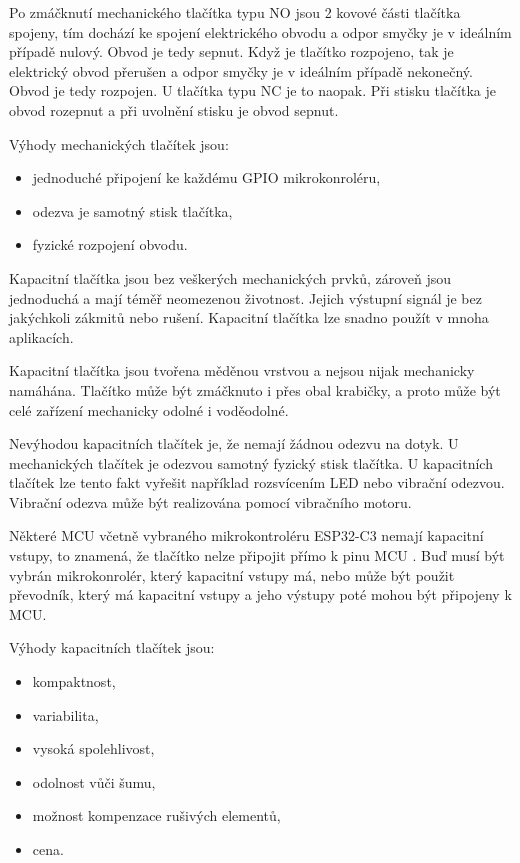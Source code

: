 Po zmáčknutí mechanického tlačítka typu NO jsou 2 kovové části tlačítka spojeny, tím dochází ke spojení elektrického obvodu 
a odpor smyčky je v ideálním případě nulový. Obvod je tedy sepnut. Když je tlačítko rozpojeno, tak je 
elektrický obvod přerušen a odpor smyčky je v ideálním případě nekonečný. Obvod je tedy rozpojen. U tlačítka typu NC je to naopak. Při stisku 
tlačítka je obvod rozepnut a při uvolnění stisku je obvod sepnut. 


Výhody mechanických tlačítek jsou:
\begin{itemize}
  \item jednoduché připojení ke každému GPIO mikrokonroléru,
  \item odezva je samotný stisk tlačítka,
  \item fyzické rozpojení obvodu.
\end{itemize}

Kapacitní tlačítka jsou bez veškerých mechanických prvků, zároveň jsou jednoduchá a mají téměř neomezenou 
životnost. Jejich výstupní signál je bez jakýchkoli zákmitů nebo rušení. Kapacitní tlačítka lze snadno použít v mnoha aplikacích. 

Kapacitní tlačítka jsou tvořena měděnou vrstvou a nejsou nijak mechanicky namáhána. Tlačítko může být zmáčknuto i přes 
obal krabičky, a proto může být celé zařízení mechanicky odolné i voděodolné. 

Nevýhodou kapacitních tlačítek je, že nemají žádnou odezvu na dotyk. U mechanických tlačítek je odezvou samotný fyzický 
stisk tlačítka. U kapacitních tlačítek lze tento fakt vyřešit například rozsvícením LED nebo vibrační odezvou. Vibrační 
odezva může být realizována pomocí vibračního motoru. 

Některé MCU včetně vybraného mikrokontroléru ESP32-C3 nemají kapacitní
vstupy, to znamená, že tlačítko nelze připojit přímo k pinu MCU \cite{ESP_C3_dtsh}. Buď musí být vybrán mikrokonrolér, který kapacitní 
vstupy má, nebo může být použit převodník, který má kapacitní vstupy a jeho výstupy poté mohou být připojeny k MCU. 

Výhody kapacitních tlačítek jsou:
\begin{itemize}
  \item kompaktnost,
  \item variabilita,
  \item vysoká spolehlivost,
  \item odolnost vůči šumu,
  \item možnost kompenzace rušivých elementů,
  \item cena. 
\end{itemize}

